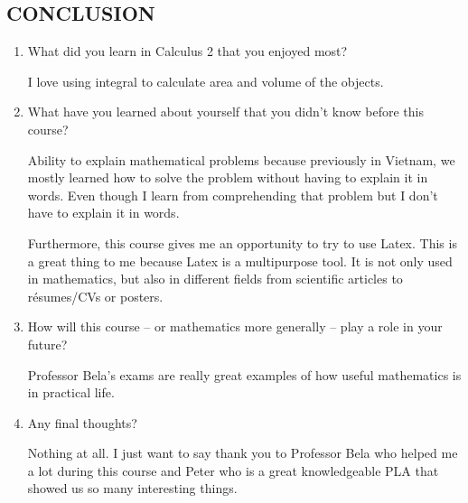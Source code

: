 \documentclass[12pt]{article}
\begin{document}

\newpage
\begin{center}
    \section*{CONCLUSION}
\end{center}

\begin{enumerate}
    \item What did you learn in Calculus 2 that you enjoyed most?\par
    
    I love using integral to calculate area and volume of the objects.
    
    
    \item What have you learned about yourself that you didn't know before this course?\par
    
    Ability to explain mathematical problems because previously in Vietnam, we mostly learned how to solve the problem without having to explain it in words. Even though I learn from comprehending that problem but I don't have to explain it in words.
    
    Furthermore, this course gives me an opportunity to try to use Latex. This is a great thing to me because Latex is a multipurpose tool. It is not only used in mathematics, but also in different fields from scientific articles to r\'esumes/CVs or posters.
    
    \item How will this course -- or mathematics more generally -- play a role in your future?\par
    
    Professor Bela's exams are really great examples of how useful mathematics is in practical life.

    
    \item Any final thoughts?
    
    Nothing at all. I just want to say thank you to Professor Bela who helped me a lot during this course and Peter who is a great knowledgeable PLA that showed us so many interesting things.

    
\end{enumerate}
\end{document}
